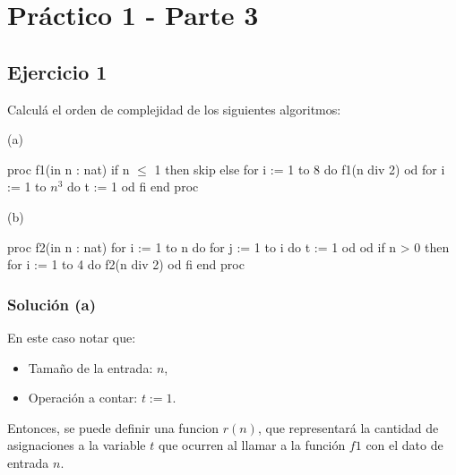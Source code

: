 \chapter{Práctico 1 - Parte 3}

\section{Ejercicio 1}
Calculá el orden de complejidad de los siguientes algoritmos:

\begin{codebox}{(a)}
\begin{pascallike}
proc f1(in n : nat)
    if n $\leq$ 1 then skip
    else
        for i := 1 to 8 do 
            f1(n div 2) 
        od
        for i := 1 to $n^3$ do 
            t := 1 
        od
    fi
end proc
\end{pascallike}
\end{codebox}

\begin{codebox}{(b)}
\begin{pascallike}
proc f2(in n : nat)
    for i := 1 to n do
        for j := 1 to i do 
            t := 1 
        od
    od
    if n > 0 then
        for i := 1 to 4 do 
            f2(n div 2) 
        od
    fi
end proc
\end{pascallike}
\end{codebox}

\subsection{Solución (a)}
En este caso notar que:
\begin{itemize}
    \item Tamaño de la entrada: $n$,
    \item Operación a contar: $t := 1$.
\end{itemize}
Entonces, se puede definir una funcion $r(n)$, que representará la cantidad de asignaciones a la variable $t$ que ocurren al llamar a la función $f1$ con el dato de entrada $n$.

